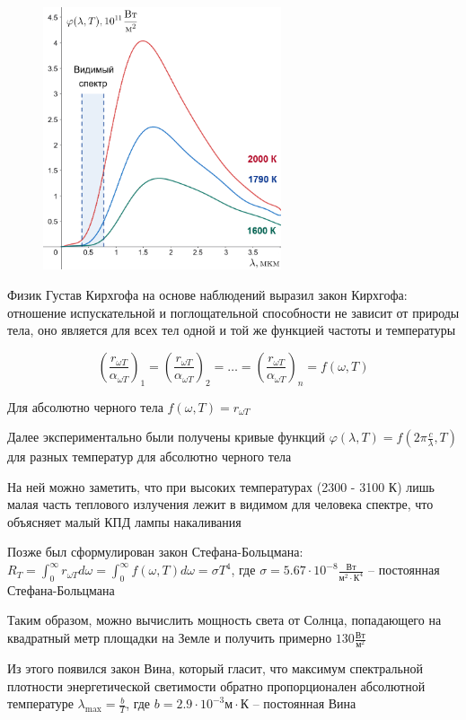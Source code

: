 \begin{figure}
    \includegraphics[width=7cm]{physics3/images/physics3_kirchhoff_law_functions}
\end{figure}

Физик Густав Кирхгофа на основе наблюдений выразил закон Кирхгофа: отношение испускательной и поглощательной способности не зависит от природы тела, оно является для всех тел одной и той же функцией частоты и температуры

\[\left(\frac{r_{\omega T}}{\alpha_{\omega T}}\right)_1 = \left(\frac{r_{\omega T}}{\alpha_{\omega T}}\right)_2 = \dots = \left(\frac{r_{\omega T}}{\alpha_{\omega T}}\right)_n = f(\omega, T)\]

Для абсолютно черного тела $f(\omega, T) = r_{\omega T}$

Далее экспериментально были получены кривые функций $\varphi(\lambda, T) = f\left(2\pi \frac{c}{\lambda}, T\right)$ для разных температур для абсолютно черного тела

На ней можно заметить, что при высоких температурах (2300 - 3100 К) лишь малая часть теплового излучения лежит в видимом для человека спектре, что объясняет малый КПД лампы накаливания


Позже был сформулирован закон Стефана-Больцмана: $R_T = \int_0^\infty r_{\omega T} d\omega = \int_0^\infty f(\omega, T) d\omega = \sigma T^4$, где $\sigma = 5.67 \cdot 10^{-8} \frac{\text{Вт}}{\text{м}^2 \cdot \text{К}^4}$ -- постоянная Стефана-Больцмана

Таким образом, можно вычислить мощность света от Солнца, попадающего на квадратный метр площадки на Земле и получить примерно $130 \frac{\text{Вт}}{\text{м}^2}$

Из этого появился закон Вина, который гласит, что максимум спектральной плотности энергетической светимости обратно пропорционален абсолютной температуре $\lambda_{\max} = \frac{b}{T}$, где $b = 2.9 \cdot 10^{-3} \text{м}\cdot\text{К}$ -- постоянная Вина

